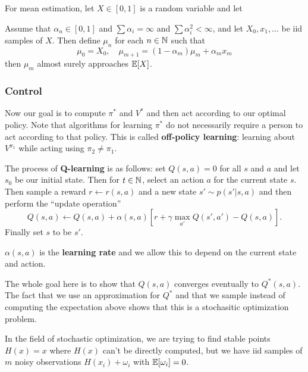 \documentclass[12pt]{article}
\begin{document}
For mean estimation, let $X\in[0,1]$ is a random variable and let 
\begin{thm}
	Assume that $\alpha_n\in[0,1]$ and $\sum \alpha_i=\infty$ and $\sum \alpha_i^2<\infty$, and let $X_0,x_1,\dots$ be iid samples of $X$. Then define $\mu_n$ for each $n\in\mathbb{N}$ such that 
	\[\mu_0=X_0,\quad \mu_{m+1}=(1-\alpha_m)\mu_m+\alpha_mx_m\]
	then $\mu_m$ almost surely approaches $\mathbb{E}[X]$.
\end{thm}


\subsubsection{Control}
Now our goal is to compute $\pi^\ast$ and $V^\ast$ and then act according to our optimal policy. Note that algorithms for learning $\pi^\ast$ do not necessarily require a person to act according to that policy.
This is called \textbf{off-policy learning}: learning about $V^{\pi_1}$ while acting using $\pi_2\ne\pi_1$.

\begin{defn}
	The process of \textbf{Q-learning} is as follows: set $Q(s,a)=0$ for all $s$ and $a$ and let $s_0$ be our initial state. Then for $t\in\mathbb{N}$,
	select an action $a$ for the current state $s$. Then sample a reward $r\leftarrow r(s,a)$ and a new state $s'\sim p(s'|s,a)$ and then perform the ``update operation''
	\[Q(s,a)\leftarrow Q(s,a)+\alpha(s,a)[r+\gamma\max_{a'}Q(s',a')-Q(s,a)].\]
	Finally set $s$ to be $s'$.
\end{defn}
\begin{rmk}
	$\alpha(s,a)$ is the \textbf{learning rate} and we allow this to depend on the current state and action.
\end{rmk}
\begin{rmk}
	The whole goal here is to show that $Q(s,a)$ converges eventually to $Q^\ast(s,a)$. The fact that we use an approximation for $Q^\ast$ and that we sample instead of computing the expectation above shows that this is a stochasitic optimization problem.
\end{rmk}

In the field of stochastic optimization, we are trying to find stable points $H(x)=x$ where $H(x)$ can't be directly computed, but we have iid samples of $m$ noisy observations $H(x_i)+\omega_i$ with $\mathbb{E}[\omega_i]=0$.
\end{document}
